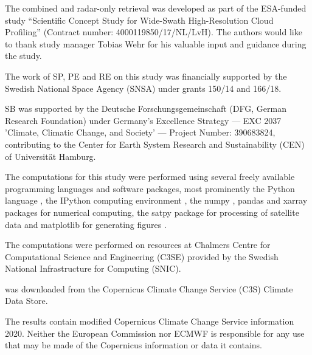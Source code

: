 \documentclass[journal abbreviation, manuscript]{copernicus}
\begin{document}
\begin{acknowledgements}
The combined and radar-only retrieval was developed as part of the ESA-funded
study ``Scientific Concept Study for Wide-Swath High-Resolution Cloud
Profiling'' (Contract number: 4000119850/17/NL/LvH). The authors would like to
thank study manager Tobias Wehr for his valuable input and guidance during the
study.

The work of SP, PE and RE on this study was financially supported by the Swedish
National Space Agency (SNSA) under grants 150/14 and 166/18.

SB was supported by the Deutsche Forschungsgemeinschaft (DFG, German Research
Foundation) under Germany's Excellence Strategy --- EXC 2037 'Climate, Climatic
Change, and Society' --- Project Number: 390683824, contributing to the Center
for Earth System Research and Sustainability (CEN) of Universit\"{a}t Hamburg.

The computations for this study were performed using several freely available
programming languages and software packages, most prominently the Python
language \citep{python}, the IPython computing environment \citep{ipython}, the
numpy \citep{numpy}, pandas \citep{pandas} and xarray \citep{xarray} packages
for numerical computing, the satpy package \citep{satpy} for processing of
satellite data and matplotlib for generating figures \citep{matplotlib}.

The computations were performed on resources at Chalmers Centre for
Computational Science and Engineering (C3SE) provided by the Swedish National
Infrastructure for Computing (SNIC).

\citet{era5} was downloaded from the Copernicus Climate Change Service (C3S)
Climate Data Store.

The results contain modified Copernicus Climate Change Service information 2020.
Neither the European Commission nor ECMWF is responsible for any use that may be
made of the Copernicus information or data it contains.

\end{acknowledgements}










\end{document}
